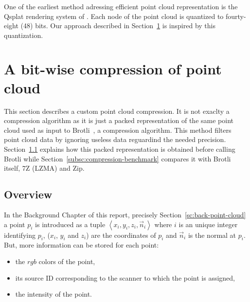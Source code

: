 One of the earliest method adressing efficient point cloud representation is the Qsplat rendering system of \cite{qsplat}. Each node of the point cloud is quantized to fourty-eight (48) bits. Our approach described in Section~\ref{sc:custom-compression} is inspired by this quantization.

\section{A bit-wise compression of point cloud}
\label{sc:custom-compression}
This section describes a custom point cloud compression. It is not exaclty a compression algorithm as it is just a packed representation of the same point cloud used as input to Brotli~\cite{brotli}, a compression algorithm. This method filters point cloud data by ignoring useless data reguardind the needed precision. Section~\ref{subsc:overview-packed} explains how this packed representation is obtained before calling Brotli while Section~\ref{subsc:compression-benchmark} compares it with Brotli itself, 7Z (LZMA) and Zip.

\subsection{Overview}
\label{subsc:overview-packed}
In the Background Chapter of this report, precisely Section~\ref{sc:back-point-cloud} a point $p_i$ is introduced as a tuple $\left\langle x_i, y_i, z_i, \vec{n}_i \right\rangle$ where $i$ is an unique integer identifying $p_i$, ($x_i$, $y_i$ and $z_i$) are the coordinates of $p_i$ and $\vec{n}_i$ is the normal at $p_i$. But, more information can be stored for each point:
\begin{itemize}
\item the $rgb$ colors of the point,
\item its source ID corresponding to the scanner to which the point is assigned,
\item the intensity of the point.
\end{itemize}

